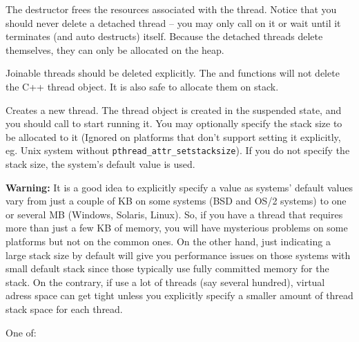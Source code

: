 \label{wxthreaddtor}


The destructor frees the resources associated with the thread. Notice that you
should never delete a detached thread -- you may only call
 on it or wait until it terminates (and auto
destructs) itself. Because the detached threads delete themselves, they can
only be allocated on the heap.

Joinable threads should be deleted explicitly. The  and  functions
will not delete the C++ thread object. It is also safe to allocate them on
stack.


\label{wxthreadcreate}


Creates a new thread. The thread object is created in the suspended state, and you
should call  to start running it.  You may optionally
specify the stack size to be allocated to it (Ignored on platforms that don't
support setting it explicitly, eg. Unix system without
\texttt{pthread\_attr\_setstacksize}). If you do not specify the stack size,
the system's default value is used.

{\bf Warning:} It is a good idea to explicitly specify a value as systems'
default values vary from just a couple of KB on some systems (BSD and
OS/2 systems) to one or several MB (Windows, Solaris, Linux). So, if you
have a thread that requires more than just a few KB of memory, you will
have mysterious problems on some platforms but not on the common ones. On the
other hand, just indicating a large stack size by default will give you
performance issues on those systems with small default stack since those
typically use fully committed memory for the stack. On the contrary, if
use a lot of threads (say several hundred), virtual adress space can get tight
unless you explicitly specify a smaller amount of thread stack space for each
thread.



One of:

\twocolwidtha{7cm}
\begin{twocollist}\itemsep=0pt
\end{twocollist}


